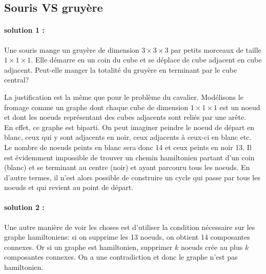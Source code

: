 \subsection{Souris VS gruyère}
\paragraph{solution 1 :}
Une souris mange un gruyère de dimension $3 \times 3 \times 3$ par petits morceaux de taille $1 \times 1 \times 1$. Elle démarre en un coin du cube et se déplace de cube adjacent en cube adjacent. Peut-elle manger la totalité du gruyère en terminant par le cube central?
\begin{solution}
La justification est la même que pour le problème du cavalier. Modélisons le fromage comme un graphe dont chaque cube de dimension $1 \times 1 \times 1$ est un noeud et dont les noeuds représentant des cubes adjacents sont reliés par une arête.\\
En effet, ce graphe est biparti. On peut imaginer peindre le noeud de départ en blanc, ceux qui y sont adjacents en noir, ceux adjacents à ceux-ci en blanc etc.\\
Le nombre de noeuds peints en blanc sera donc 14 et ceux peints en noir 13. Il est évidemment impossible de trouver un chemin hamiltonien partant d'un coin (blanc) et se terminant au centre (noir) et ayant parcouru tous les noeuds.
En d'autre termes, il n'est alors possible de construire un cycle qui passe par tous les noeuds et qui revient au point de départ. 
\paragraph{solution 2 :}
Une autre manière de voir les choses est d'utiliser la condition nécessaire sur les graphe hamiltoniens: si on supprime les 13 noeuds, on obtient 14 composantes connexes. Or si un graphe est hamiltonien, supprimer $k$ noeuds crée au plus $k$ composantes connexes. On a une contradiction et donc le graphe n'est pas hamiltonien.
\end{solution}

